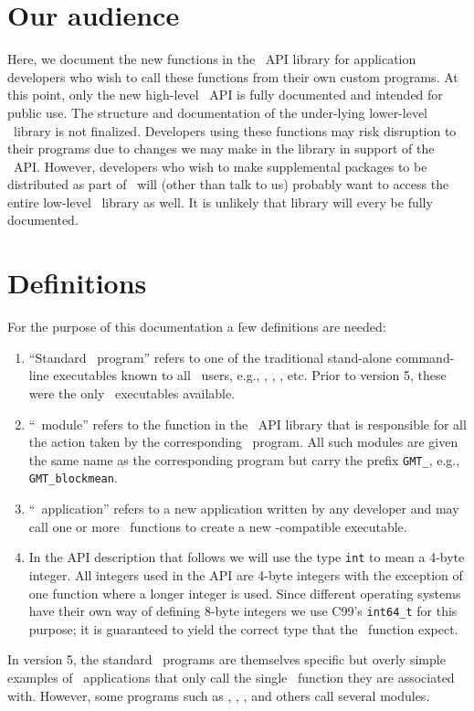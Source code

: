 \documentclass[11pt]{report}
\begin{document}
\section{Our audience}

Here, we document the new functions in the \GMT\ API library for application developers
who wish to call these functions from their own custom programs.  At this point,
only the new high-level \GMT\ API is fully documented and intended for public use.
The structure and documentation of the under-lying lower-level \GMT\ library is not finalized.
Developers using these functions may risk disruption to their programs due to changes we may
make in the library in support of the \GMT\ API.  However, developers who wish to make supplemental
packages to be distributed as part of \GMT\ will (other than talk to us) probably want to access
the entire low-level \GMT\ library as well.  It is unlikely that library will every be fully
documented.

\section{Definitions}

For the purpose of this documentation a few definitions are needed:

\begin{enumerate}
\item ``Standard \GMT\ program'' refers to one of the traditional stand-alone command-line
executables known to all \GMT\ users, e.g., , ,
, etc.  Prior to version 5, these were the only \GMT\ executables available.
\item ``\GMT\ module'' refers to the function in the \GMT\ API
library that is responsible for all the action taken by the corresponding \GMT\ program.  All
such modules are given the same name as the corresponding program but carry the
prefix \texttt{GMT\_}, e.g., \texttt{GMT\_blockmean}.
\item ``\GMT\ application'' refers to a new application written by any developer
and may call one or more \GMT\ functions to create a new \GMT-compatible executable.
\item In the API description that follows we will use the type \texttt{int} to mean
a 4-byte integer.  All integers used in the API are 4-byte integers with the exception
of one function where a longer integer is used.  Since different operating systems have their
own way of defining 8-byte integers we use C99's \texttt{int64\_t} for this purpose; it is guaranteed to yield
the correct type that the \GMT\ function expect.
\end{enumerate}
In version 5, the standard \GMT\ programs are themselves specific but overly simple examples
of \GMT\ applications that only call the single \GMT\ function they are associated with.
However, some programs such as , , ,
 and others call several modules.
\end{document}
